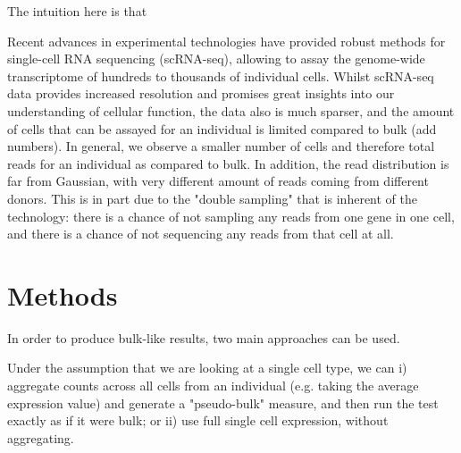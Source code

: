 The intuition here is that 

Recent advances in experimental technologies have provided robust methods for single-cell RNA sequencing (scRNA-seq), allowing to assay the genome-wide transcriptome of hundreds to thousands of individual cells. 
Whilst scRNA-seq data provides increased resolution and promises great insights into our understanding of cellular function, the data also is much sparser, and the amount of cells that can be assayed for an individual is limited compared to bulk (add numbers).
In general, we observe a smaller number of cells and therefore total reads for an individual as compared to bulk. 
In addition, the read distribution is far from Gaussian, with very different amount of reads coming from different donors. 
This is in part due to the "double sampling" that is inherent of the technology: there is a chance of not sampling any reads from one gene in one cell, and there is a chance of not sequencing any reads from that cell at all.


\section{Methods}

In order to produce bulk-like results, two main approaches can be used.

Under the assumption that we are looking at a single cell type, we can i) aggregate counts across all cells from an individual (e.g. taking the average expression value) and generate a "pseudo-bulk" measure, and then run the test exactly as if it were bulk; or ii) use full single cell expression, without aggregating.



